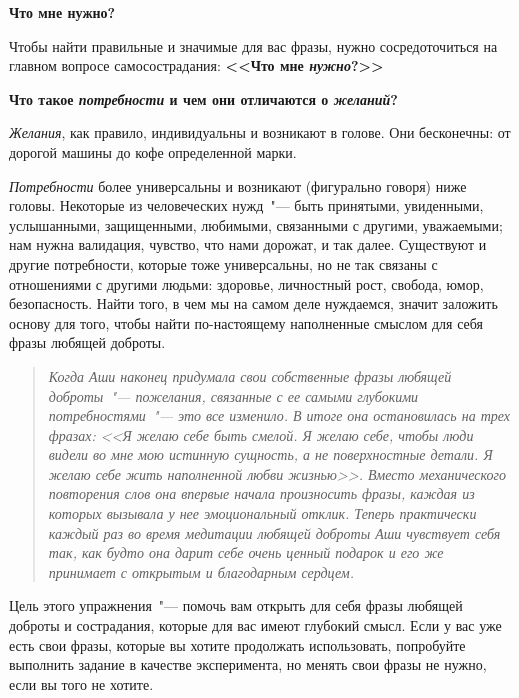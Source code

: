 \newpage
{\large \textbf{Что мне нужно?}} \label{What_Do_I_Need} 

\vspace{2ex}

Чтобы найти правильные и значимые для вас фразы, нужно сосредоточиться на главном вопросе самосострадания: \textbf{<<Что мне \textit{нужно}?>>}

\vspace{2ex}

\textbf{Что такое \emph{потребности} и чем они отличаются о \emph{желаний}? }

\vspace{2ex}

\emph{Желания}, как правило, индивидуальны и возникают в голове. Они бесконечны: от дорогой машины до кофе определенной марки.

\emph{Потребности} более универсальны и возникают (фигурально говоря) ниже головы. Некоторые из человеческих нужд~"--- быть принятыми, увиденными, услышанными, защищенными, любимыми, связанными с другими, уважаемыми; нам нужна валидация, чувство, что нами дорожат, и так далее. Существуют и другие потребности, которые тоже универсальны, но не так связаны с отношениями с другими людьми: здоровье, личностный рост, свобода, юмор, безопасность. Найти того, в чем мы на самом деле нуждаемся, значит заложить основу для того, чтобы найти по-настоящему наполненные смыслом для себя фразы любящей доброты.

\begin{quotation}
	\textit{
		Когда Аши наконец придумала свои собственные фразы любящей доброты~"--- пожелания, связанные с ее самыми глубокими потребностями~"--- это все изменило. В итоге она остановилась на трех фразах: <<Я желаю себе быть смелой. Я желаю себе, чтобы люди видели во мне мою истинную сущность, а не поверхностные детали. Я желаю себе жить наполненной любви жизнью>>. Вместо механического повторения слов она впервые начала произносить фразы, каждая из которых вызывала у нее эмоциональный отклик. Теперь практически каждый раз во время медитации любящей доброты Аши чувствует себя так, как будто она дарит себе очень ценный подарок и его же принимает с открытым и благодарным сердцем.
	}
\end{quotation}

\newpage
{} \label{Ex:Finding_Loving-Kindness_Phrases}

Цель этого упражнения~"--- помочь вам открыть для себя фразы любящей доброты и сострадания, которые для вас имеют глубокий смысл. Если у вас уже есть свои фразы, которые вы хотите продолжать использовать, попробуйте выполнить задание в качестве эксперимента, но менять свои фразы не нужно, если вы того не хотите.

